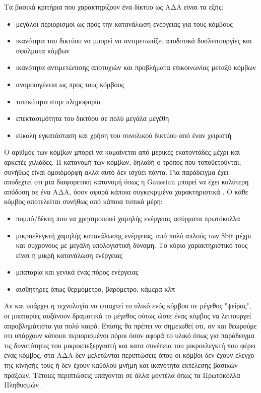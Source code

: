 Τα βασικά κριτήρια που χαρακτηρίζουν ένα δίκτυο ως ΑΔΑ είναι τα εξής:
\begin{itemize}
\item μεγάλοι περιορισμοί ως προς την κατανάλωση ενέργειας για τους κόμβους
\item ικανότητα του δικτύου να μπορεί να αντιμετωπίζει αποδοτικά δυσλειτουργίες και σφάλματα κόμβων
\item ικανότητα αντιμετώπισης αποτυχιών και προβλήματα επικοινωνίας μεταξύ κόμβων
\item ανομοιογένεια ως προς τους κόμβους
\item τοπικότητα στην πληροφορία
\item επεκτασιμότητα του δικτύου σε πολύ μεγάλα μεγέθη
\item εύκολη εγκατάσταση και χρήση του συνολικού δικτύου από έναν χειριστή
\end{itemize}
Ο αριθμός των κόμβων μπορεί να κυμαίνεται από μερικές εκατοντάδες μέχρι και αρκετές χιλιάδες.
Η κατανομή των κόμβων, δηλαδή ο τρόπος που τοποθετούνται, συνήθως είναι ομοιόμορφη αλλά αυτό δεν ισχύει πάντα. Για παράδειγμα έχει αποδεχτεί οτι μια διαφορετική
κατανομή όπως η Gaussian μπορεί να έχει καλύτερη απόδοση σε ένα ΑΔΑ, όσον αφορά κάποια συγκεκριμένα χαρακτηριστικά \cite{gaussian_sensors}.
Ο κάθε κόμβος αποτελείται συνήθως από κάποια τυπικά μέρη:
\begin{itemize}
\item πομπό/δέκτη που να χρησιμοποιεί χαμηλής ενέργειας ασύρματα πρωτόκολλα
\item μικροελεγκτή χαμηλής κατανάλωσης ενέργειας, από πολύ απλούς των 8bit μέχρι και σύχρονους με μεγάλη υπολογιστική δύναμη. Το κύριο χαρακτηριστικό τους είναι η
μικρή κατανάλωση ενέργειας
\item μπαταρία και γενικά ένας πόρος ενέργειας
\item αισθητήρες όπως θερμόμετρο, βαρόμετρο, κάμερα κλπ
\end{itemize}
Αν και υπάρχει η τεχνολογία να φτιαχτεί το υλικό ενός κόμβου σε μέγεθος "ψείρας", οι μπαταρίες αυξάνουν δραματικά το μέγεθος ούτως ώστε ένας κόμβος να λειτουργεί
απροβλημάτιστα για πολύ καιρό.
Επίσης θα πρέπει να σημειωθεί οτι, αν και θεωρούμε οτι υπάρχουν κάποιοι περιορισμένοι πόροι όσον αφορά το υλικό όπως για παράδειγμα τις δυνατότητες
του μικροεπεξεργαστή και κατα συνέπεια του μικροελεγκτή που φέρει ένας κόμβος, στα ΑΔΑ δεν μελετώνται περιπτώσεις όπου οι κόμβοι δεν έχουν έλεγχο της κίνησής τους ή
δεν έχουν καθόλου μνήμη και ικανότητα εκτέλεσης βασικών πράξεων.
Τέτοιες περιπτώσεις υπάγονται σε άλλα μοντέλα όπως τα Πρωτόκολλα Πληθυσμών \cite{population_protocols}.

